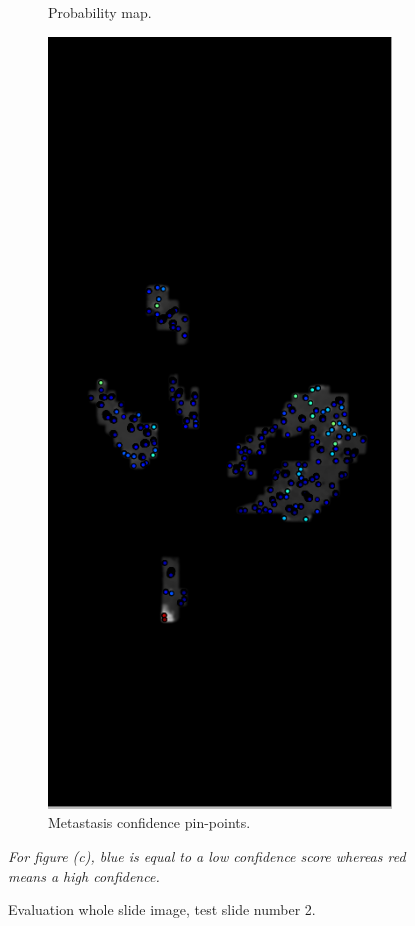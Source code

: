 \documentclass[a4paper,10pt]{article}
\begin{document}
\begin{figure}[!ht]
\begin{subfigure}{.33\textwidth}
  \caption{Probability map.}
  \label{ProbabilityMapLocalMaxima}
\end{subfigure}
\begin{subfigure}{.33\textwidth}
  \centering
  \includegraphics[width=\linewidth]{Detection.png}
  \caption{Metastasis confidence pin-points.}
  \label{Detecting maxima}
\end{subfigure}
\textit{For figure (c), blue is equal to a low confidence score whereas red means a high confidence.}
\caption{Evaluation whole slide image, test slide number 2.}
\label{fig:test}
\end{figure}
\end{document}
